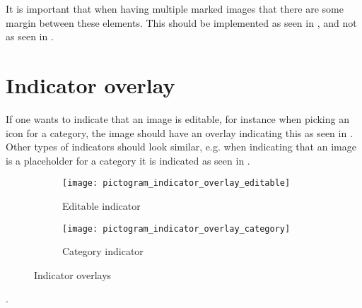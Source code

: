 \begin{note}
	It is important that when having multiple marked images that there are some margin between these elements. This should be implemented as seen in , and not as seen in .
\end{note} 

\section{Indicator overlay}
\label{sec:indicator_overlay}

If one wants to indicate that an image is editable, for instance when picking an icon for a category, the image should have an overlay indicating this as seen in . Other types of indicators should look similar, e.g. when indicating that an image is a placeholder for a category it is indicated as seen in .

\begin{figure}[!htbp]
    \centering

    \begin{subfigure}[t]{0.4\textwidth}
        \centering
        \texttt{[image: pictogram\_indicator\_overlay\_editable]}
        \caption{Editable indicator}
        \label{fig:pictogram_indicator_overlay_editable}
    \end{subfigure}
    \hspace{5em} 
    \begin{subfigure}[t]{0.4\textwidth}
        \centering
        \texttt{[image: pictogram\_indicator\_overlay\_category]}
        \caption{Category indicator}
        \label{fig:pictogram_indicator_overlay_category}
    \end{subfigure}
    
    \caption{Indicator overlays}
    \label{fig:pictograms_overlay}
\end{figure}

.
